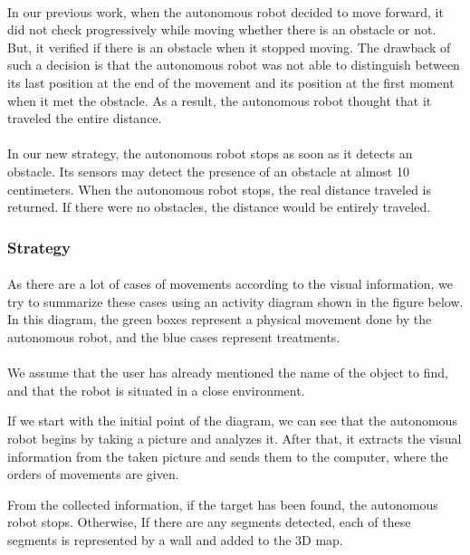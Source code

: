\documentclass[12pt]{report}
\begin{document}
\paragraph{}
In our previous work, when the autonomous robot decided to move forward, it did not check progressively while moving whether there is an obstacle or not. But, it verified if there is an obstacle when it stopped moving. The drawback of such a decision is that the autonomous robot was not able to distinguish between its last position at the end of the movement and its position at the first moment when it met the obstacle. As a result, the autonomous robot thought that it traveled the entire distance.

\paragraph{}
In our new strategy, the autonomous robot stops as soon as it detects an obstacle. Its sensors may detect the presence of an obstacle at almost 10 centimeters. When the autonomous robot stops, the real distance traveled is returned. If there were no obstacles, the distance would be entirely traveled.
\subsubsection{Strategy}
\paragraph{}
As there are a lot of cases of movements according to the visual information, we try to summarize these cases using an activity diagram shown in the figure below. In this diagram, the green boxes represent a physical movement done by the autonomous robot, and the blue cases represent treatments. 

\paragraph{}
We assume that the user has already mentioned the name of the object to find, and that the robot is situated in a close environment.

If we start with the initial point of the diagram, we can see that the autonomous robot begins by taking a picture and analyzes it. After that, it extracts the visual information from the taken picture and sends them to the computer, where the orders of movements are given. 

From the collected information, if the target has been found, the autonomous robot stops. Otherwise, If there are any segments detected, each of these segments is represented by a wall and added to the 3D map.
\end{document}
